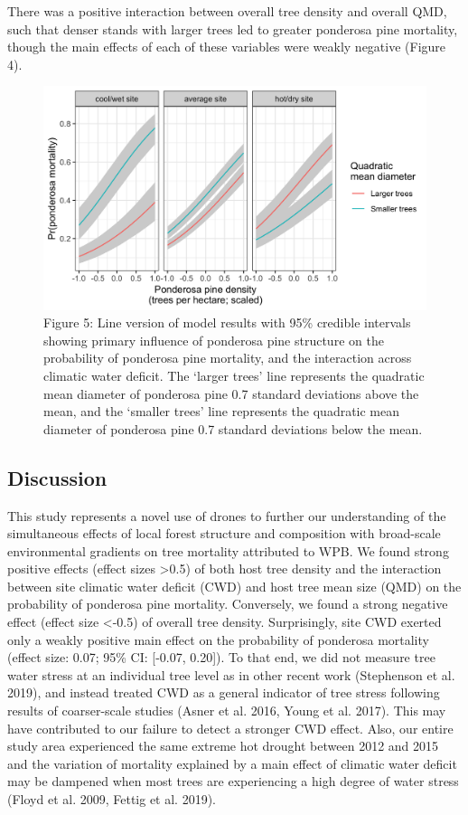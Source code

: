 \documentclass[]{article}
\begin{document}
There was a positive interaction between overall tree density and
overall QMD, such that denser stands with larger trees led to greater
ponderosa pine mortality, though the main effects of each of these
variables were weakly negative (Figure 4).

\begin{figure}
\centering
\includegraphics{../../figures/pipo_tpha_qmd_cwd_interaction.png}
\caption{Figure 5: Line version of model results with 95\% credible
intervals showing primary influence of ponderosa pine structure on the
probability of ponderosa pine mortality, and the interaction across
climatic water deficit. The `larger trees' line represents the quadratic
mean diameter of ponderosa pine 0.7 standard deviations above the mean,
and the `smaller trees' line represents the quadratic mean diameter of
ponderosa pine 0.7 standard deviations below the mean.}
\end{figure}

\hypertarget{discussion}{%
\subsection{Discussion}\label{discussion}}

This study represents a novel use of drones to further our understanding
of the simultaneous effects of local forest structure and composition
with broad-scale environmental gradients on tree mortality attributed to
WPB. We found strong positive effects (effect sizes \textgreater{}0.5)
of both host tree density and the interaction between site climatic
water deficit (CWD) and host tree mean size (QMD) on the probability of
ponderosa pine mortality. Conversely, we found a strong negative effect
(effect size \textless{}-0.5) of overall tree density. Surprisingly,
site CWD exerted only a weakly positive main effect on the probability
of ponderosa mortality (effect size: 0.07; 95\% CI: {[}-0.07, 0.20{]}).
To that end, we did not measure tree water stress at an individual tree
level as in other recent work (Stephenson et al. 2019), and instead
treated CWD as a general indicator of tree stress following results of
coarser-scale studies (Asner et al. 2016, Young et al. 2017). This may
have contributed to our failure to detect a stronger CWD effect. Also,
our entire study area experienced the same extreme hot drought between
2012 and 2015 and the variation of mortality explained by a main effect
of climatic water deficit may be dampened when most trees are
experiencing a high degree of water stress (Floyd et al. 2009, Fettig et
al. 2019).
\end{document}
